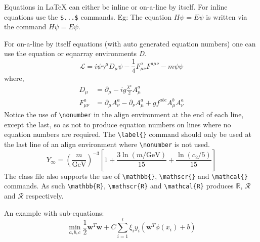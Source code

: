 \documentclass[Theme1]{{template_material/eurostat}}
\begin{document}
Equations in \LaTeX{} can either be inline or on-a-line by itself. For
inline equations use the \verb+$...$+ commands. Eg: The equation
$H\psi = E \psi$ is written via the command $H \psi = E \psi$.

For on-a-line by itself equations (with auto generated equation numbers)
one can use the equation or eqnarray environments \textit{D}.
\begin{equation}
\mathcal{L} = i {\psi} \gamma^\mu D_\mu \psi
    - \frac{1}{4} F_{\mu\nu}^a F^{a\mu\nu} - m {\psi} \psi
\label{eq1}
\end{equation}
where,
\begin{align}
D_\mu &=  \partial_\mu - ig \frac{\lambda^a}{2} A^a_\mu
\nonumber \\
F^a_{\mu\nu} &= \partial_\mu A^a_\nu - \partial_\nu A^a_\mu
    + g f^{abc} A^b_\mu A^a_\nu
\label{eq2}
\end{align}
Notice the use of \verb+\nonumber+ in the align environment at the end
of each line, except the last, so as not to produce equation numbers on
lines where no equation numbers are required. The \verb+\label{}+ command
should only be used at the last line of an align environment where
\verb+\nonumber+ is not used.
\begin{equation}
Y_\infty = \left( \frac{m}{\textrm{GeV}} \right)^{-3}
    \left[ 1 + \frac{3 \ln(m/\textrm{GeV})}{15}
    + \frac{\ln(c_2/5)}{15} \right]
\end{equation}
The class file also supports the use of \verb+\mathbb{}+, \verb+\mathscr{}+ and
\verb+\mathcal{}+ commands. As such \verb+\mathbb{R}+, \verb+\mathscr{R}+
and \verb+\mathcal{R}+ produces $\mathbb{R}$, $\mathscr{R}$ and $\mathcal{R}$
respectively.

An example with sub-equations:
\begin{subequations}
\begin{equation}
  \operatorname{min}_{a,b,c} 
  \frac{1}{2}\mathbf{w}^{T}\mathbf{w} + C \sum_{i=1}^{l}\xi_{i} 
\end{equation}    
\begin{equation}
  y_{i}\left(\mathbf{w}^{T}\phi(x_{i})+b\right)
\end{equation}
\end{subequations}
\end{document}
